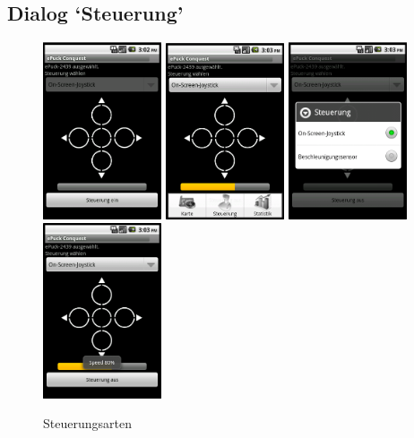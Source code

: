 \documentclass[10pt,a4paper]{article}
\begin{document}
			\subsection{Dialog `Steuerung'}
			
			\begin{figure}[h]
				  \centering
				\includegraphics[width=3.5cm]{screenshots_neu/control.png}
				\includegraphics[width=3.5cm]{screenshots_neu/control_menu.png}
				\includegraphics[width=3.5cm]{screenshots_neu/control_spinner.png}
				\includegraphics[width=3.5cm]{screenshots_neu/control_speed.png}				
  				\caption{Steuerungsarten}
  			\end{figure}	
			
\end{document}
